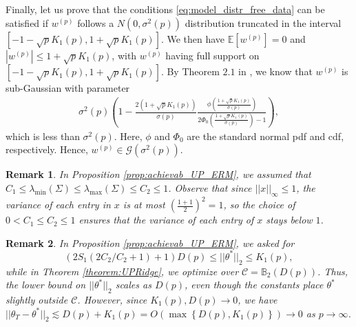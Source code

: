 \documentclass{article}
\newtheorem{remark}{\textbf{Remark}}
\begin{document}
Finally, let us prove that the conditions \eqref{eq:model_distr_free_data} can be satisfied if $w^{(p)}$ follows a $N(0, \sigma^2(p))$ distribution truncated in the interval $[-1 - \sqrt{p}K_1(p), 1 + \sqrt{p}K_1(p)]$. We then have $\mathbb{E}\left[w^{(p)}\right] = 0$ and $\left|w^{(p)}\right| \leq 1 + \sqrt{p}K_1(p)$, with $w^{(p)}$ having full support on $[-1 - \sqrt{p}K_1(p), 1 + \sqrt{p}K_1(p)]$. By Theorem $2.1$ in \cite{SUB_GAUSS_TRUNC}, we know that $w^{(p)}$ is sub-Gaussian with parameter
\begin{align*}
\sigma^2(p)\left(1 - \frac{2(1 + \sqrt{p}K_1(p))}{\sigma(p)}\frac{\phi\left(\frac{1 + \sqrt{p}K_1(p)}{\sigma(p)}\right)}{2\Phi_0\left(\frac{1 + \sqrt{p}K_1(p)}{\sigma(p)}\right) - 1}\right),
\end{align*}
which is less than $\sigma^2(p)$. Here, $\phi$ and $\Phi_0$ are the standard normal pdf and cdf, respectively. Hence, $w^{(p)} \in \mathcal{G}\left(\sigma^2(p)\right)$.

\begin{remark}\label{remark:DIST_FREE_HP_CONST}
In Proposition \ref{prop:achievab_UP_ERM}, we assumed that $C_1 \leq \lambda_{\min}(\Sigma) \leq \lambda_{\max}(\Sigma) \leq C_2 \leq 1$. Observe that since $||x||_{\infty} \leq 1$, the variance of each entry in $x$ is at most $\left(\frac{1 + 1}{2}\right)^2 = 1$, so the choice of $0 < C_1 \leq C_2 \leq 1$ ensures that the variance of each entry of $x$ stays below $1$.
%
\end{remark}

\begin{remark}
In Proposition \ref{prop:achievab_UP_ERM}, we asked for
$$(2S_1(2C_2/C_2 + 1) + 1)D(p) \leq ||\theta^*||_2 \leq K_1(p),$$
while in Theorem \ref{theorem:UPRidge}, we optimize over $\mathcal{C} = \mathbb{B}_2\left(D(p)\right)$. Thus, the lower bound on $||\theta^*||_2$ scales as $D(p)$, even though the constants place $\theta^*$ slightly outside $\mathcal{C}$. However, since $K_1(p), D(p) \rightarrow 0$, we have $||\theta_T - \theta^*||_2 \lesssim D(p) + K_1(p) = O\left(\max\left\{D(p), K_1(p)\right\}\right) \rightarrow 0$ as $p \rightarrow \infty$. 
\end{remark}
\end{document}
